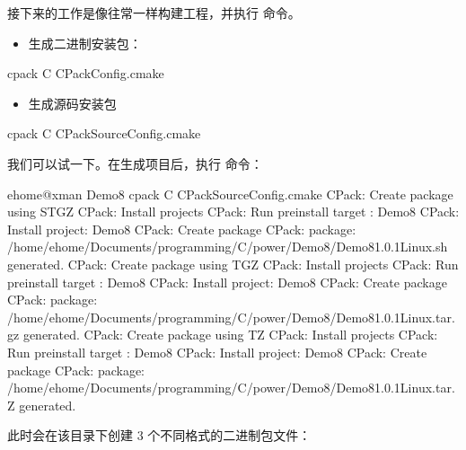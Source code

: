 \documentclass[a4paper,12pt,english]{sphinxmanual}
\begin{document}
\sphinxAtStartPar
接下来的工作是像往常一样构建工程，并执行  命令。
\begin{itemize}
\item {} 
\sphinxAtStartPar
生成二进制安装包：

\end{itemize}

\begin{sphinxVerbatim}[commandchars=\\\{\}]
cpack \PYGZhy{}C CPackConfig.cmake
\end{sphinxVerbatim}
\begin{itemize}
\item {} 
\sphinxAtStartPar
生成源码安装包

\end{itemize}

\begin{sphinxVerbatim}[commandchars=\\\{\}]
cpack \PYGZhy{}C CPackSourceConfig.cmake
\end{sphinxVerbatim}

\sphinxAtStartPar
我们可以试一下。在生成项目后，执行  命令：

\begin{sphinxVerbatim}[commandchars=\\\{\}]
\PYG{o}{[}ehome@xman Demo8\PYG{o}{]}\PYGZdl{} cpack \PYGZhy{}C CPackSourceConfig.cmake
CPack: Create package using STGZ
CPack: Install projects
CPack: \PYGZhy{} Run preinstall target : Demo8
CPack: \PYGZhy{} Install project: Demo8
CPack: Create package
CPack: \PYGZhy{} package: /home/ehome/Documents/programming/C/power/Demo8/Demo8\PYGZhy{}1.0.1\PYGZhy{}Linux.sh generated.
CPack: Create package using TGZ
CPack: Install projects
CPack: \PYGZhy{} Run preinstall target : Demo8
CPack: \PYGZhy{} Install project: Demo8
CPack: Create package
CPack: \PYGZhy{} package: /home/ehome/Documents/programming/C/power/Demo8/Demo8\PYGZhy{}1.0.1\PYGZhy{}Linux.tar.gz generated.
CPack: Create package using TZ
CPack: Install projects
CPack: \PYGZhy{} Run preinstall target : Demo8
CPack: \PYGZhy{} Install project: Demo8
CPack: Create package
CPack: \PYGZhy{} package: /home/ehome/Documents/programming/C/power/Demo8/Demo8\PYGZhy{}1.0.1\PYGZhy{}Linux.tar.Z generated.
\end{sphinxVerbatim}

\sphinxAtStartPar
此时会在该目录下创建 3 个不同格式的二进制包文件：
\end{document}

